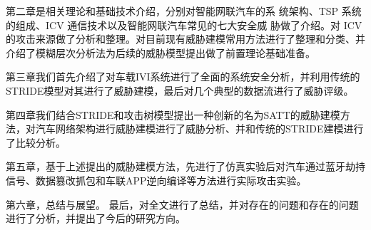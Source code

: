 第二章是相关理论和基础技术介绍，分别对智能网联汽车的系
统架构、TSP 系统的组成、ICV 通信技术以及智能网联汽车常见的七大安全威
胁做了介绍。对 ICV 的攻击来源做了分析和整理。对目前现有威胁建模常用方法进行了整理和分类、并介绍了模糊层次分析法为后续的威胁模型提出做了前置理论基础准备。

第三章我们首先介绍了对车载IVI系统进行了全面的系统安全分析，并利用传统的STRIDE模型对其进行了威胁建模，最后对几个典型的数据流进行了威胁评级。

第四章我们结合STRIDE和攻击树模型提出一种创新的名为SATT的威胁建模方法，对汽车网络架构进行威胁建模进行了威胁分析、并和传统的STRIDE建模进行了比较分析。

第五章，基于上述提出的威胁建模方法，先进行了仿真实验后对汽车通过蓝牙劫持信号、数据篡改抓包和车联APP逆向编译等方法进行实际攻击实验。

第六章，总结与展望。
最后，对全文进行了总结，并对存在的问题和存在的问题进行了分析，并提出了今后的研究方向。
